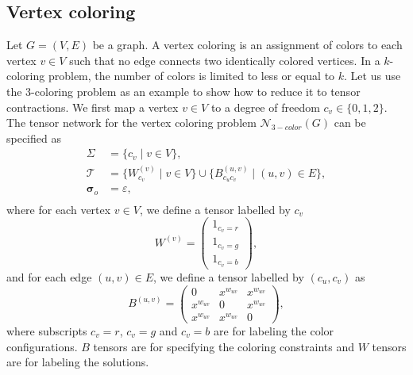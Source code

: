 \documentclass[review, onefignum, onetabnum]{siamart190516}
\begin{document}
\subsection{Vertex coloring}
Let $G=(V,E)$ be a graph. A vertex coloring is an assignment of colors to each vertex $v\in V$ such that no edge connects two identically colored vertices. 
In a $k$-coloring problem, the number of colors is limited to less or equal to $k$.
Let us use the 3-coloring problem as an example to show how to reduce it to tensor contractions.
We first map a vertex $v \in V$ to a degree of freedom $c_v\in\{0,1,2\}$.
The tensor network for the vertex coloring problem $\mathcal{N}_{3-color}(G)$ can be specified as
\begin{equation}\label{eq:colortensornetwork}
\begin{split}
    \Sigma &= \{c_v \mid v \in V\},\\
    \mathcal{T} &= \{W^{(v)}_{c_v} \mid v\in V\} \cup \{B^{(u, v)}_{c_uc_v} \mid (u, v) \in E\},\\
    \boldsymbol{\sigma}_o &= \varepsilon,\\
\end{split}
\end{equation}
where for each vertex $v \in V$, we define a tensor labelled by $c_v$
\begin{equation}
    W^{(v)} = \left(\begin{matrix}
        1_{c_{v} = r}\\
        1_{c_{v} = g}\\
        1_{c_{v} = b}
    \end{matrix}\right),
\end{equation}
and for each edge $(u, v) \in E$, we define a tensor labelled by $(c_u, c_v)$ as
\begin{equation}
    B^{(u, v)} = \left(\begin{matrix}
        0 & x^{w_{uv}} & x^{w_{uv}}\\
        x^{w_{uv}} & 0 & x^{w_{uv}}\\
        x^{w_{uv}} & x^{w_{uv}} & 0
    \end{matrix}\right),
\end{equation}
where subscripts $c_v = r$, $c_v = g$ and $c_v = b$ are for labeling the color configurations. $B$ tensors are for specifying the coloring constraints and $W$ tensors are for labeling the solutions.
\end{document}
